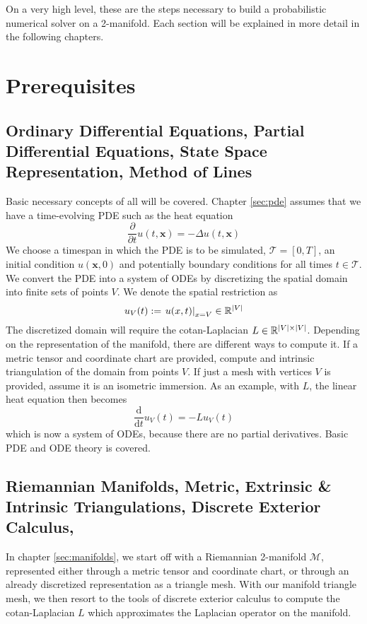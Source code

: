 \ifdefined\COMPILINGFROMMAIN
\else
    
    
\fi


On a very high level, these are the steps necessary to build a probabilistic numerical solver on a 2-manifold. Each section will be explained in more detail in the following chapters.

\section{Prerequisites}
\subsection*{Ordinary Differential Equations, Partial Differential Equations, State Space Representation, Method of Lines}
Basic necessary concepts of all will be covered.
Chapter \ref{sec:pde} assumes that we have a time-evolving PDE such as the heat equation $$\frac{\partial}{\partial t}u(t,\mathbf{x}) = -\Delta u(t,\mathbf{x})$$ We choose a timespan in which the PDE is to be simulated, $\mathcal{T} = [0, T]$, an initial condition $u(\mathbf{x}, 0)$ and potentially boundary conditions for all times $t\in \mathcal{T}$. We convert the PDE into a system of ODEs by discretizing the spatial domain into finite sets of points $V$. We denote the spatial restriction as $$u_V(t) := \left . u(x,t)\right|_{x=V} \in \mathbb{R}^{|V|}$$ The discretized domain will require the cotan-Laplacian $L \in \mathbb{R}^{|V|\times |V|}$. Depending on the representation of the manifold, there are different ways to compute it.  If a metric tensor and coordinate chart are provided, compute and intrinsic triangulation of the domain from points $V$. If just a mesh with vertices $V$ is provided, assume it is an isometric immersion. As an example, with $L$, the linear heat equation then becomes $$\frac{\text{d}}{\text{d} t}u_V(t) = -Lu_V(t)$$ which is now a system of ODEs, because there are no partial derivatives. Basic PDE and ODE theory is covered.
\subsection*{Riemannian Manifolds, Metric, Extrinsic \& Intrinsic Triangulations, Discrete Exterior Calculus, }
In chapter \ref{sec:manifolds}, we start off with a Riemannian 2-manifold $\mathcal{M}$, represented either through a metric tensor and coordinate chart, or through an already discretized representation as a triangle mesh. With our manifold triangle mesh, we then resort to the tools of discrete exterior calculus to compute the cotan-Laplacian $L$ which approximates the Laplacian operator on the manifold.

